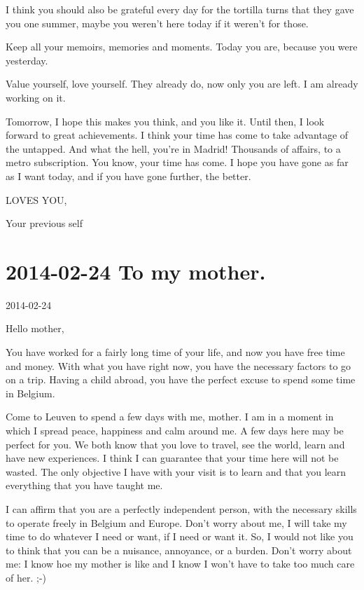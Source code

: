 \documentclass[]{book}
\begin{document}
I think you should also be grateful every day for the tortilla turns that they gave you one summer, maybe you weren't here today if it weren't for those.

Keep all your memoirs, memories and moments. Today you are, because you were yesterday.

Value yourself, love yourself. They already do, now only you are left. I am already working on it.

Tomorrow, I hope this makes you think, and you like it. Until then, I look forward to great achievements. I think your time has come to take advantage of the untapped. And what the hell, you're in Madrid! Thousands of affairs, to a metro subscription. You know, your time has come. I hope you have gone as far as I want today, and if you have gone further, the better.

LOVES YOU,

Your previous self

\hypertarget{tomother20140224}{%
\section*{2014-02-24 To my mother.}\label{tomother20140224}}

2014-02-24

Hello mother,

You have worked for a fairly long time of your life, and now you have free time and money. With what you have right now, you have the necessary factors to go on a trip. Having a child abroad, you have the perfect excuse to spend some time in Belgium.

Come to Leuven to spend a few days with me, mother. I am in a moment in which I spread peace, happiness and calm around me. A few days here may be perfect for you. We both know that you love to travel, see the world, learn and have new experiences. I think I can guarantee that your time here will not be wasted. The only objective I have with your visit is to learn and that you learn everything that you have taught me.

I can affirm that you are a perfectly independent person, with the necessary skills to operate freely in Belgium and Europe. Don't worry about me, I will take my time to do whatever I need or want, if I need or want it. So, I would not like you to think that you can be a nuisance, annoyance, or a burden. Don't worry about me: I know hoe my mother is like and I know I won't have to take too much care of her. ;-)
\end{document}
